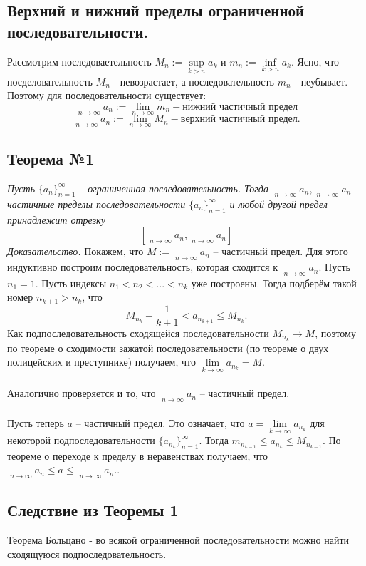 \documentclass[12pt]{article}
\theoremstyle{definition}
\DeclareMathOperator*\lowlim{\underline{lim}}
\DeclareMathOperator*\uplim{\overline{lim}}
\begin{document}
	\subsection{Верхний и нижний пределы ограниченной последовательности.}
	Рассмотрим последоваетельность $M_n := \sup\limits_{k>n} a_k$ и $m_n := \inf\limits_{k>n}a_k$. Ясно, что посделовательность $M_n$ - невозрастает, а последовательность $m_n$ - неубывает. Поэтому для \underline{} последовательности существует:\[
	\lowlim\limits_{n\rightarrow\infty} a_n := \lim\limits_{n\rightarrow\infty} m_n - \textbf{нижний частичный предел}
	\] \[
	\uplim\limits_{n\rightarrow\infty} a_n := \lim\limits_{n\rightarrow\infty} M_n - \textbf{верхний частичный предел}.
	\]
	\subsection{Теорема №1}
	\label{subsec:t1}
	\textit{Пусть} $\{a_n\}_{n=1}^{\infty}$ \textit{-- ограниченная последовательность. Тогда} $\uplim\limits_{n \to \infty} a_n, \lowlim\limits_{n \to \infty} a_n$ \textit{-- частичные пределы последовательности} $\{a_n\}_{n=1}^{\infty}$ \textit{и любой другой предел принадлежит отрезку} \[[\lowlim\limits_{n \to \infty} a_n, \uplim\limits_{n \to \infty} a_n]
	\]
	\textit{Доказательство.}
	Покажем, что $M := \uplim\limits_{n \to \infty} a_n$ -- частичный предел. Для этого индуктивно построим последовательность, которая сходится к $\uplim\limits_{n \to \infty} a_n$. Пусть $n_1 = 1$. Пусть индексы $n_1 < n_2 < ... < n_k$ уже построены. Тогда подберём такой номер $n_{k+1} > n_k$, что
	\[
	M_{n_k} - \frac{1}{k+1} < a_{n_{k+1}} \leq M_{n_k}.
	\]
	Как подпоследовательность сходящейся последовательности $M_{n_k} \to M$, поэтому по теореме о сходимости зажатой последовательности (по теореме о двух полицейских и преступнике) получаем, что $\lim\limits_{k \to \infty} a_{n_k} = M$. \\\\
	Аналогично проверяется и то, что $\lowlim\limits_{n \to \infty} a_n$ -- частичный предел. \\\\
	Пусть теперь $a$ -- частичный предел. Это означает, что $a = \lim\limits_{k \to \infty} a_{n_k}$ для некоторой подпоследовательности $\{a_{n_k}\}_{n=1}^{\infty}$. Тогда $m_{n_{k-1}} \leq a_{n_{k}} \leq M_{n_{k-1}}$. По теореме о переходе к пределу в неравенствах получаем, что $\lowlim\limits_{n \to \infty} a_n \leq a \leq \uplim\limits_{n \to \infty} a_n$..
	\subsection{Следствие из Теоремы 1}
	Теорема Больцано - во всякой ограниченной последовательности можно найти сходящуюся подпоследовательность.
\end{document}
